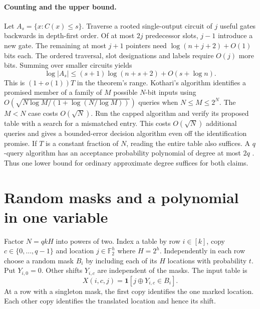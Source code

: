 \documentclass[11pt]{article}
\newcommand{\F}{\mathbb F_2}
\begin{document}
\paragraph{Counting and the upper bound.}
Let $A_s=\{x:C(x)\le s\}$. Traverse a rooted single-output circuit of $j$ useful gates backwards in depth-first order. Of at most $2j$ predecessor slots, $j-1$ introduce a new gate. The remaining at most $j+1$ pointers need $\log(n+j+2)+O(1)$ bits each. The ordered traversal, slot designations and labels require $O(j)$ more bits. Summing over smaller circuits yields
\[
                \log |A_s|\le(s+1)\log(n+s+2)+O(s+\log n).               \tag{1}
\]
This is $(1+o(1))T$ in the theorem's range. Kothari's algorithm \cite{koth} identifies a promised member of a family of $M$ possible $N$-bit inputs using $O(\sqrt{N\log M/(1+\log(N/\log M))})$ queries when $N\le M\le 2^N$. The $M<N$ case costs $O(\sqrt N)$. Run the capped algorithm and verify its proposed table with a search for a mismatched entry. This costs $O(\sqrt N)$ additional queries and gives a bounded-error decision algorithm even off the identification promise. If $T$ is a constant fraction of $N$, reading the entire table also suffices. A $q$-query algorithm has an acceptance probability polynomial of degree at most $2q$ \cite{beals}. Thus one lower bound for ordinary approximate degree suffices for both claims.

\section{Random masks and a polynomial in one variable}
Factor $N=qkH$ into powers of two. Index a table by row $i\in[k]$, copy $c\in\{0,\ldots,q-1\}$ and location $j\in\F^{h}$ where $H=2^h$. Independently in each row choose a random mask $B_i$ by including each of its $H$ locations with probability $t$. Put $Y_{i,0}=0$. Other shifts $Y_{i,c}$ are independent of the masks. The input table is
\[
             X(i,c,j)=\mathbf1[j\mathbin\oplus Y_{i,c}\in B_i].              \tag{2}
\]
At a row with a singleton mask, the first copy identifies the one marked location. Each other copy identifies the translated location and hence its shift.
\end{document}
